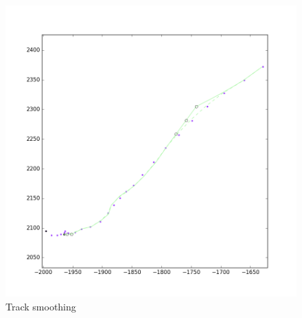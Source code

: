 \begin{figure}
\centering
\includegraphics[width = .9\textwidth]{Figures/track_smoothing_dummy_markers.png}
\caption{Track smoothing}\label{fig:track_smoothing}
\end{figure}
